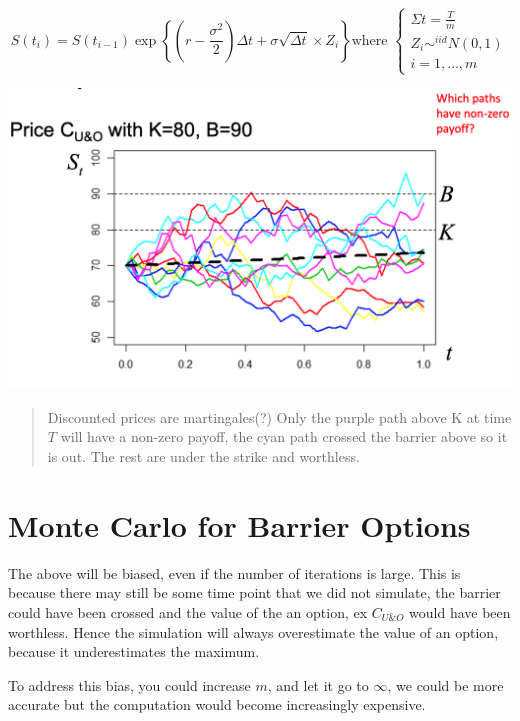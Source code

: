 \documentclass[
  oneside]{book}
\begin{document}
\[
S(t_{i}) = S(t_{i-1})\exp \left\{ \left( r- \frac{\sigma^{2}}{2} \right)\Delta t + \sigma \sqrt{ \Delta t }\times Z_{i} \right\} \text{where } \begin{cases}
\Sigma t = \frac{T}{m} \\
Z_{i} \sim^{iid} N(0,1) \\
i=1,\dots,m
\end{cases}
\]

\includegraphics{Notes/Obsidian-Attachments/11-Pricing-Derivatives.png}

\begin{quote}
Discounted prices are martingales(?) Only the purple path above K at time \(T\) will have a non-zero payoff, the cyan path crossed the barrier above so it is out. The rest are under the strike and worthless.
\end{quote}

\hypertarget{monte-carlo-for-barrier-options}{%
\section{Monte Carlo for Barrier Options}\label{monte-carlo-for-barrier-options}}

The above will be biased, even if the number of iterations is large. This is because there may still be some time point that we did not simulate, the barrier could have been crossed and the value of the an option, ex \(C_{U\&O}\) would have been worthless. Hence the simulation will always overestimate the value of an option, because it underestimates the maximum.

To address this bias, you could increase \(m\), and let it go to \(\infty\), we could be more accurate but the computation would become increasingly expensive.
\end{document}
